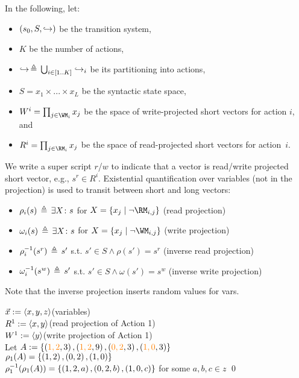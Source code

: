 \documentclass[12pt]{article}
\begin{document}
In the following, let:
\begin{itemize}
	\item $\left( s_0, S, \hookrightarrow \right)$ be the transition system, 
	\item $K$ be the number of actions,
	\item $\hookrightarrow \,\triangleq\, \bigcup_{i\in [1..K]} \hookrightarrow_i$ be its partitioning into actions,
	\item  $S = x_1 \times ... \times x_L$ be the syntactic state space,
	\item  $W^{i} = \prod_{j \in \WM_{i}} x_j$ be the space of write-projected short vectors for action $i$, and
	\item  $R^{i} = \prod_{j \in \RM_{i}} x_j$ be the space of read-projected short vectors for action~$i$.
\end{itemize}

We write a super script $r$/$w$ to indicate that a vector is
read/write projected short vector, e.g., $s^r\in R^i$.
Existential quantification over variables (not in the projection) is used to
transit between short and long vectors:
\begin{itemize}
	\item $\rho_i(s) \,\triangleq\, \exists X\colon s$ for $X=\set{x_j\mid \neg \RM_{i,j}}$
\hfill (read projection)
	\item $\omega_i(s) \,\triangleq\, \exists X\colon s$ for $X=\set{x_j\mid \neg \WM_{i,j}}$
\hfill (write projection)
	\item $\rho^{-1}_i(s^r) \,\triangleq\, s'$ s.t. $s' \in S \land \rho(s')=s^r$
\hfill (inverse read projection)
	\item $\omega^{-1}_i(s^w) \,\triangleq\, s'$ s.t. $s' \in S \land \omega(s')=s^w$
\hfill (inverse write projection)
\end{itemize}

\def\vx{\vec x}
\begin{example}
Note that the inverse projection inserts random values for vars.

\noindent
	$\vx := \possibly{x,y,z}$\hfill (variables)\\
	$R^1 := \left\langle x,y \right\rangle$\hfill (read projection of Action 1)\\
	$W^1 := \left\langle y \right\rangle$\hfill (write projection of Action 1)\\

\noindent
Let $A := \left\lbrace \left( \textcolor{orange}{1,2},3 \right), \left( \textcolor{orange}{1,2},9 \right), \left( \textcolor{orange}{0,2},3 \right), \left( \textcolor{orange}{1,0},3 \right) \right\rbrace$\\
\noindent
	$\rho_1(A) = \left\lbrace \left( 1,2 \right), \left( 0,2 \right), \left( 1,0 \right) \right\rbrace$\\
\noindent
	$\rho_1^{-1}(\rho_1(A)) = \{\left( 1,2,a \right), \left( 0,2,b \right), \left( 1,0,c \right)\}$ for 
	some $a,b,c \in z$
\qed
\end{example}
\end{document}
